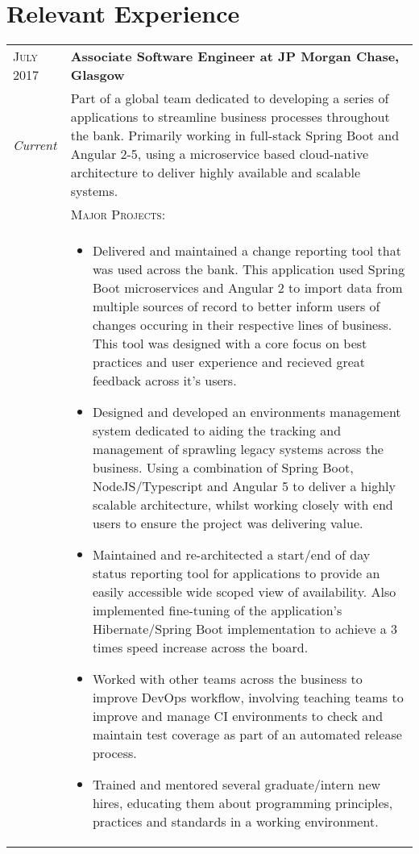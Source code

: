 \section{Relevant Experience}

\begin{tabular}{p{60pt}|p{11cm}}
	\hspace*{\fill}\textsc{July 2017} & \textbf{Associate Software Engineer at JP Morgan Chase, Glasgow} \\
	
	\hspace*{\fill}\emph{Current}& \small{
		Part of a global team dedicated to developing a series of applications to streamline business processes throughout the bank. Primarily working in full-stack Spring Boot and Angular 2-5, using a microservice based cloud-native architecture to deliver highly available and scalable systems.
	} \\

	\ & \vspace{1pt}\textsc{Major Projects}: \\

	&\vspace{-0.9em}\begin{itemize}[itemsep=0pt,topsep=0pt,leftmargin=*]\small
		\item Delivered and maintained a change reporting tool that was used across the bank. This application used Spring Boot microservices and Angular 2 to import data from multiple sources of record to better inform users of changes occuring in their respective lines of business. This tool was designed with a core focus on best practices and user experience and recieved great feedback across it's users. 
		\end{itemize}
		\begin{itemize}[itemsep=0pt,topsep=0pt,leftmargin=*]\small
		\item Designed and developed an environments management system dedicated to aiding the tracking and management of sprawling legacy systems across the business. Using a combination of Spring Boot, NodeJS/Typescript and Angular 5 to deliver a highly scalable architecture, whilst working closely with end users to ensure the project was delivering value.
		\item Maintained and re-architected a start/end of day status reporting tool for applications to provide an easily accessible wide scoped view of availability. Also implemented fine-tuning of the application's Hibernate/Spring Boot implementation to achieve a 3 times speed increase across the board.
		\item Worked with other teams across the business to improve DevOps workflow, involving teaching teams to improve and manage CI environments to check and maintain test coverage as part of an automated release process.
		\item Trained and mentored several graduate/intern new hires, educating them about programming principles, practices and standards in a working environment.
	\end{itemize}\vspace{-1.8em}


\end{tabular}
